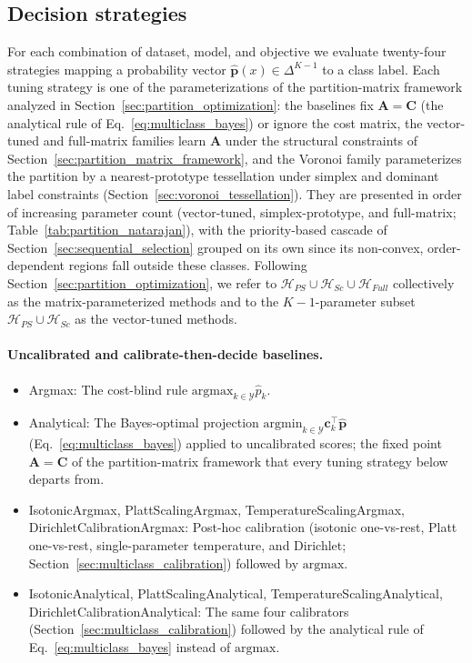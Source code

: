 \subsection{Decision strategies}\label{sec:multiclass_strategies}
For each combination of dataset, model, and objective we evaluate twenty-four strategies mapping a probability vector $\hat{\mathbf{p}}(x) \in \Delta^{K-1}$ to a class label. Each tuning strategy is one of the parameterizations of the partition-matrix framework analyzed in Section~\ref{sec:partition_optimization}: the baselines fix $\mathbf{A} = \mathbf{C}$ (the analytical rule of Eq.~\ref{eq:multiclass_bayes}) or ignore the cost matrix, the vector-tuned and full-matrix families learn $\mathbf{A}$ under the structural constraints of Section~\ref{sec:partition_matrix_framework}, and the Voronoi family parameterizes the partition by a nearest-prototype tessellation under simplex and dominant label constraints (Section~\ref{sec:voronoi_tessellation}). They are presented in order of increasing parameter count (vector-tuned, simplex-prototype, and full-matrix; Table~\ref{tab:partition_natarajan}), with the priority-based cascade of Section~\ref{sec:sequential_selection} grouped on its own since its non-convex, order-dependent regions fall outside these classes. Following Section~\ref{sec:partition_optimization}, we refer to $\mathcal{H}_{PS} \cup \mathcal{H}_{Sc} \cup \mathcal{H}_{Full}$ collectively as the matrix-parameterized methods and to the $K-1$-parameter subset $\mathcal{H}_{PS} \cup \mathcal{H}_{Sc}$ as the vector-tuned methods.

\paragraph{Uncalibrated and calibrate-then-decide baselines.}
\begin{itemize}
    \item Argmax: The cost-blind rule $\mathrm{argmax}_{k \in \mathcal{Y}} \hat{p}_k$.
    \item Analytical: The Bayes-optimal projection $\mathrm{argmin}_{k \in \mathcal{Y}} \mathbf{c}_k^\top \hat{\mathbf{p}}$ (Eq.~\ref{eq:multiclass_bayes}) applied to uncalibrated scores; the fixed point $\mathbf{A} = \mathbf{C}$ of the partition-matrix framework that every tuning strategy below departs from.
    \item {\sloppy IsotonicArgmax, PlattScalingArgmax, TemperatureScalingArgmax, DirichletCalibrationArgmax: Post-hoc calibration (isotonic one-vs-rest, Platt one-vs-rest, single-parameter temperature, and Dirichlet; Section~\ref{sec:multiclass_calibration}) followed by $\mathrm{argmax}$.\par}
    \item {\sloppy IsotonicAnalytical, PlattScalingAnalytical, TemperatureScalingAnalytical, DirichletCalibrationAnalytical: The same four calibrators (Section~\ref{sec:multiclass_calibration}) followed by the analytical rule of Eq.~\ref{eq:multiclass_bayes} instead of $\mathrm{argmax}$.\par}
\end{itemize}

